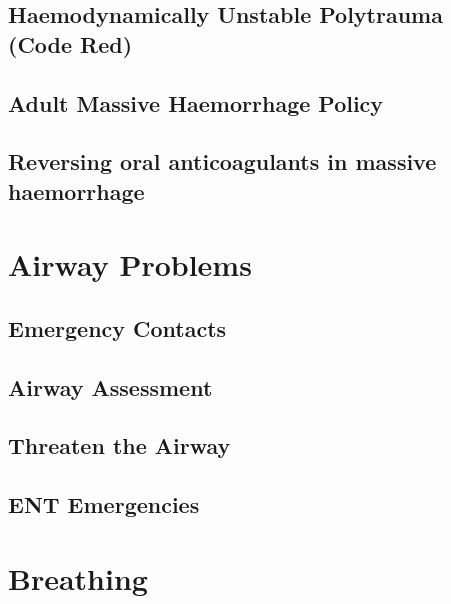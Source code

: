 \documentclass[]{book}
\begin{document}
\hypertarget{haemodynamically-unstable-polytrauma-code-red}{%
\section{Haemodynamically Unstable Polytrauma (Code Red)}\label{haemodynamically-unstable-polytrauma-code-red}}

\hypertarget{adult-massive-haemorrhage-policy}{%
\section{Adult Massive Haemorrhage Policy}\label{adult-massive-haemorrhage-policy}}

\hypertarget{reversing-oral-anticoagulants-in-massive-haemorrhage}{%
\section{Reversing oral anticoagulants in massive haemorrhage}\label{reversing-oral-anticoagulants-in-massive-haemorrhage}}

\hypertarget{airprob}{%
\chapter{Airway Problems}\label{airprob}}

\hypertarget{emergency-contacts}{%
\section{Emergency Contacts}\label{emergency-contacts}}

\hypertarget{airway-assessment}{%
\section{Airway Assessment}\label{airway-assessment}}

\hypertarget{threaten-the-airway}{%
\section{Threaten the Airway}\label{threaten-the-airway}}

\hypertarget{ent-emergencies}{%
\section{ENT Emergencies}\label{ent-emergencies}}

\hypertarget{breath}{%
\chapter{Breathing}\label{breath}}
\end{document}
